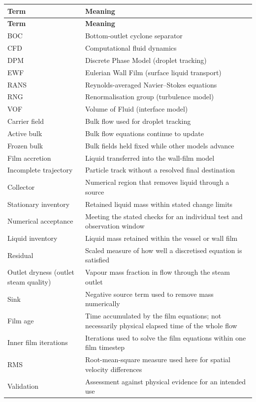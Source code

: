 \addtocounter{table}{-1}
\renewcommand{\theHtable}{glossary-1}
\begin{longtable}{@{}>{\raggedright\arraybackslash}p{0.29000000\dimexpr\linewidth-2\tabcolsep\relax}>{\raggedright\arraybackslash}p{0.71000000\dimexpr\linewidth-2\tabcolsep\relax}@{}}
\toprule
\textbf{Term} & \textbf{Meaning} \\
\midrule
\endfirsthead
\toprule
\textbf{Term} & \textbf{Meaning} \\
\midrule
\endhead
BOC & Bottom-outlet cyclone separator \\
CFD & Computational fluid dynamics \\
DPM & Discrete Phase Model (droplet tracking) \\
EWF & Eulerian Wall Film (surface liquid transport) \\
RANS & Reynolds-averaged Navier--Stokes equations \\
RNG & Renormalisation group (turbulence model) \\
VOF & Volume of Fluid (interface model) \\
Carrier field & Bulk flow used for droplet tracking \\
Active bulk & Bulk flow equations continue to update \\
Frozen bulk & Bulk fields held fixed while other models advance \\
Film accretion & Liquid transferred into the wall-film model \\
Incomplete trajectory & Particle track without a resolved final destination \\
Collector & Numerical region that removes liquid through a source \\
Stationary inventory & Retained liquid mass within stated change limits \\
Numerical acceptance & Meeting the stated checks for an individual test and observation window \\
Liquid inventory & Liquid mass retained within the vessel or wall film \\
Residual & Scaled measure of how well a discretised equation is satisfied \\
Outlet dryness (outlet steam quality) & Vapour mass fraction in flow through the steam outlet \\
Sink & Negative source term used to remove mass numerically \\
Film age & Time accumulated by the film equations; not necessarily physical elapsed time of the whole flow \\
Inner film iterations & Iterations used to solve the film equations within one film timestep \\
RMS & Root-mean-square measure used here for spatial velocity differences \\
Validation & Assessment against physical evidence for an intended use \\
\bottomrule
\end{longtable}
\renewcommand{\theHtable}{\arabic{table}}

